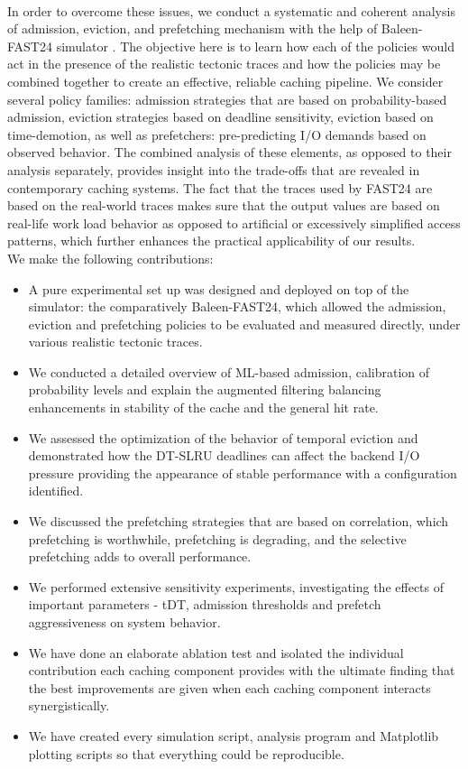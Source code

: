 \documentclass[sigconf]{acmart}
\begin{document}
{\\In order to overcome these issues, we conduct a systematic and coherent analysis of admission, eviction, and prefetching mechanism with the help of Baleen-FAST24 simulator \cite{baleen_artifact}. The objective here is to learn how each of the policies would act in the presence of the realistic tectonic traces and how the policies may be combined together to create an effective, reliable caching pipeline. We consider several policy families: admission strategies that are based on probability-based admission, eviction strategies based on deadline sensitivity, eviction based on time-demotion, as well as prefetchers: pre-predicting I/O demands based on observed behavior. The combined analysis of these elements, as opposed to their analysis separately, provides insight into the trade-offs that are revealed in contemporary caching systems. The fact that the traces used by FAST24 are based on the real-world traces makes sure that the output values are based on real-life work load behavior as opposed to artificial or excessively simplified access patterns, which further enhances the practical applicability of our results.\\
We make the following contributions:
\begin{itemize}
\item A pure experimental set up was designed and deployed on top of the simulator: the comparatively Baleen-FAST24, which allowed the admission, eviction and prefetching policies to be evaluated and measured directly, under various realistic tectonic traces.
\item We conducted a detailed overview of ML-based admission, calibration of probability levels and explain the augmented filtering balancing enhancements in stability of the cache and the general hit rate.
\item We assessed the optimization of the behavior of temporal eviction and demonstrated how the DT-SLRU deadlines can affect the backend I/O pressure providing the appearance of stable performance with a configuration identified.
\item We discussed the prefetching strategies that are based on correlation, which prefetching is worthwhile, prefetching is degrading, and the selective prefetching adds to overall performance.
\item We performed extensive sensitivity experiments, investigating the effects of important parameters - tDT, admission thresholds and prefetch aggressiveness on system behavior.
\item We have done an elaborate ablation test and isolated the individual contribution each caching component provides with the ultimate finding that the best improvements are given when each caching component interacts synergistically.
\item We have created every simulation script, analysis program and Matplotlib plotting scripts so that everything could be reproducible.
\end{itemize}

}
\end{document}
